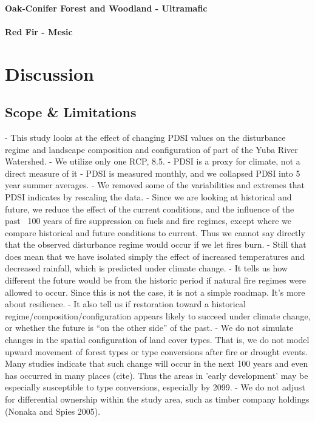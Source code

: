 \documentclass[12pt]{article}
\begin{document}
\begin{spacing}{1}
\paragraph{Oak-Conifer Forest and Woodland - Ultramafic}

\paragraph{Red Fir - Mesic}

\section*{Discussion}

\subsection*{Scope \& Limitations}
- This study looks at the effect of changing PDSI values on the disturbance regime and landscape composition and configuration of part of the Yuba River Watershed. 
- We utilize only one RCP, 8.5.
- PDSI is a proxy for climate, not a direct measure of it
- PDSI is measured monthly, and we collapsed PDSI into 5 year summer averages.
- We removed some of the variabilities and extremes that PDSI indicates by rescaling the data.
- Since we are looking at historical and future, we reduce the effect of the current conditions, and the influence of the past ~100 years of fire suppression on fuels and fire regimes, except where we compare historical and future conditions to current. Thus we cannot say directly that the observed disturbance regime would occur if we let fires burn.
- Still that does mean that we have isolated simply the effect of increased temperatures and decreased rainfall, which is predicted under climate change.
- It tells us how different the future would be from the historic period if natural fire regimes were allowed to occur. Since this is not the case, it is not a simple roadmap. It's more about resilience. 
- It also tell us if restoration toward a historical regime/composition/configuration appears likely to succeed under climate change, or whether the future is ``on the other side'' of the past.
- We do not simulate changes in the spatial configuration of land cover types. That is, we do not model upward movement of forest types or type conversions after fire or drought events. Many studies indicate that such change will occur in the next 100 years and even has occurred in many places (cite). Thus the areas in 'early development' may be especially susceptible to type conversions, especially by 2099.
- We do not adjust for differential ownership within the study area, such as timber company holdings (Nonaka and Spies 2005).


\end{spacing}
\end{document}
